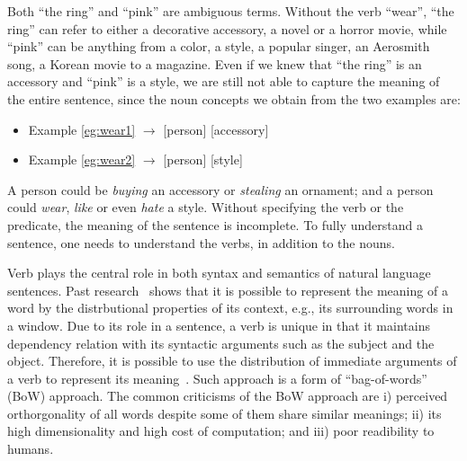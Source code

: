 {%
%
Both ``the ring'' and ``pink'' are ambiguous terms.
Without the verb ``wear'', ``the ring'' can refer to either
a decorative accessory, a novel or a horror movie,
while ``pink'' can be anything from
a color, a style, a popular singer, an Aerosmith song,
a Korean movie to a magazine.
%
%
Even if we knew that ``the ring'' is an accessory and
``pink'' is a style, we are still not able to capture the meaning
of the entire sentence, since the noun concepts we obtain from the
two examples are:
\begin{itemize}
\item Example \ref{eg:wear1} $\longrightarrow$ [person] [accessory]
\item Example \ref{eg:wear2} $\longrightarrow$ [person] [style]
\end{itemize}
A person could be {\em buying} an accessory or {\em stealing}
an ornament; and a person could {\em wear}, {\em like} or
even {\em hate} a style. Without specifying the verb
or the predicate, the meaning of the sentence is incomplete.
To fully understand a sentence, one needs to understand the verbs,
in addition to the nouns.
} %

Verb plays the central role in both syntax and semantics of natural
language sentences. Past research~\cite{DBLP:journals/corr/abs-1301-3781,DBLP:journals/corr/MikolovSCCD13,Mikolov13linguisticregularities} shows that it is
possible to represent the meaning of a word by the distrbutional
properties of its context, e.g., its surrounding words in a window.
Due to its role in
a sentence, a verb is unique in that it maintains dependency relation
with its syntactic arguments such as the subject and the object.
Therefore, it is possible to use the
distribution of immediate arguments of a verb
to represent its meaning~\cite{Levy-acl14}. Such approach is a form of
``bag-of-words'' (BoW) approach. The common criticisms of the BoW approach
are i) perceived orthorgonality of all words despite some of them share similar
meanings; ii) its high dimensionality and high cost of computation; and
iii) poor readibility to humans.

